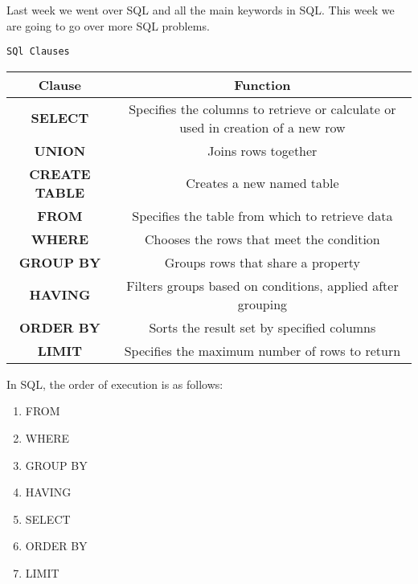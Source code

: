 Last week we went over SQL and all the main keywords in SQL. This week we are going to go over more SQL problems.

\begin{center}
    \lstinline{SQl Clauses}
    \begin{tabular}{|c|c|}
     \hline
     \textbf{Clause} & \textbf{Function} \\
     \hline
     \textbf{SELECT} & Specifies the columns to retrieve or calculate or used in creation of a new row \\
     \hline
     \textbf{UNION} & Joins rows together \\
     \hline
     \textbf{CREATE TABLE} & Creates a new named table \\
     \hline
     \textbf{FROM} & Specifies the table from which to retrieve data \\
     \hline
     \textbf{WHERE} & Chooses the rows that meet the condition \\
     \hline
     \textbf{GROUP BY} & Groups rows that share a property \\
     \hline
     \textbf{HAVING} & Filters groups based on conditions, applied after grouping \\
     \hline
     \textbf{ORDER BY} & Sorts the result set by specified columns \\
     \hline
     \textbf{LIMIT} & Specifies the maximum number of rows to return \\
     \hline
    \end{tabular}
\end{center}

In SQL, the order of execution is as follows:
\begin{enumerate}
    \item FROM
    \item WHERE
    \item GROUP BY
    \item HAVING
    \item SELECT
    \item ORDER BY
    \item LIMIT
\end{enumerate}